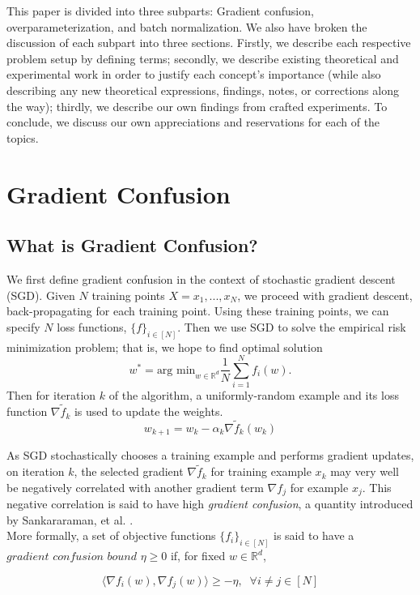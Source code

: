 \documentclass{article}
\begin{document}
This paper is divided into three subparts: Gradient confusion, overparameterization, and batch normalization. We also have broken the discussion of each subpart into three sections. Firstly, we describe each respective problem setup by defining terms; secondly, we describe existing theoretical and experimental work in order to justify each concept's importance (while also describing any new theoretical expressions, findings, notes, or corrections along the way); thirdly, we describe our own findings from crafted experiments. To conclude, we discuss our own appreciations and reservations for each of the topics.


\section{Gradient Confusion}
\subsection{What is Gradient Confusion?}
We first define gradient confusion in the context of stochastic gradient descent (SGD). Given $N$ training points $X = x_1,...,x_N$, we proceed with gradient descent, back-propagating for each training point. Using these training points, we can specify $N$ loss functions, $\{f\}_{i \in [N]}$. Then we use SGD to solve the empirical risk minimization problem; that is, we hope to find optimal solution
$$w^* = \text{arg min}_{w \in \mathbb{R}^d} \frac{1}{N} \sum_{i=1}^N f_i (w).$$
Then for iteration $k$ of the algorithm, a uniformly-random example and its loss function $\nabla \tilde{f}_k$ is used to update the weights.
$$w_{k+1} = w_k - \alpha_k \nabla \tilde{f}_k(w_k)$$

As SGD stochastically chooses a training example and performs gradient updates, on iteration $k$, the selected gradient $\nabla \tilde{f}_k$ for training example $x_k$ may very well be negatively correlated with another gradient term $\nabla f_j$ for example $x_j$. This negative correlation is said to have high \textit{gradient confusion}, a quantity introduced by Sankararaman, et al. \cite{gradient_confusion}. \\

More formally, a set of objective functions $\{f_i\}_{i \in [N]}$ is said to have a $\textit{gradient confusion bound}$ $\eta \geq 0$ if, for fixed $w \in \mathbb{R}^d$,

$$ \langle \nabla f_i(w), \nabla f_j(w) \rangle \geq -\eta, \;\; \forall i \not = j \in [N]$$
\end{document}
